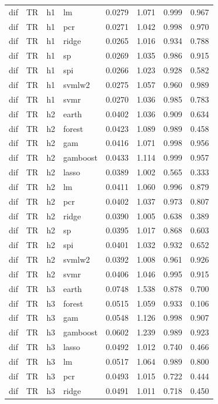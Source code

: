 \begin{ThreePartTable}
\begin{longtable}[t]{llclcccc}
dif & TR & h1 & lm & 0.0279 & 1.071 & 0.999 & 0.967\\
dif & TR & h1 & pcr & 0.0271 & 1.042 & 0.998 & 0.970\\
dif & TR & h1 & ridge & 0.0265 & 1.016 & 0.934 & 0.788\\
dif & TR & h1 & sp & 0.0269 & 1.035 & 0.986 & 0.915\\
dif & TR & h1 & spi & 0.0266 & 1.023 & 0.928 & 0.582\\
dif & TR & h1 & svmlw2 & 0.0275 & 1.057 & 0.960 & 0.989\\
dif & TR & h1 & svmr & 0.0270 & 1.036 & 0.985 & 0.783\\
\addlinespace
dif & TR & h2 & earth & 0.0402 & 1.036 & 0.909 & 0.634\\
dif & TR & h2 & forest & 0.0423 & 1.089 & 0.989 & 0.458\\
dif & TR & h2 & gam & 0.0416 & 1.071 & 0.998 & 0.956\\
dif & TR & h2 & gamboost & 0.0433 & 1.114 & 0.999 & 0.957\\
dif & TR & h2 & lasso & 0.0389 & 1.002 & 0.565 & 0.333\\
dif & TR & h2 & lm & 0.0411 & 1.060 & 0.996 & 0.879\\
dif & TR & h2 & pcr & 0.0402 & 1.037 & 0.973 & 0.807\\
dif & TR & h2 & ridge & 0.0390 & 1.005 & 0.638 & 0.389\\
dif & TR & h2 & sp & 0.0395 & 1.017 & 0.868 & 0.603\\
dif & TR & h2 & spi & 0.0401 & 1.032 & 0.932 & 0.652\\
dif & TR & h2 & svmlw2 & 0.0392 & 1.008 & 0.961 & 0.926\\
dif & TR & h2 & svmr & 0.0406 & 1.046 & 0.995 & 0.915\\
\addlinespace
dif & TR & h3 & earth & 0.0748 & 1.538 & 0.878 & 0.700\\
dif & TR & h3 & forest & 0.0515 & 1.059 & 0.933 & 0.106\\
dif & TR & h3 & gam & 0.0548 & 1.126 & 0.998 & 0.907\\
dif & TR & h3 & gamboost & 0.0602 & 1.239 & 0.989 & 0.923\\
dif & TR & h3 & lasso & 0.0492 & 1.012 & 0.740 & 0.466\\
dif & TR & h3 & lm & 0.0517 & 1.064 & 0.989 & 0.800\\
dif & TR & h3 & pcr & 0.0493 & 1.015 & 0.722 & 0.444\\
dif & TR & h3 & ridge & 0.0491 & 1.011 & 0.718 & 0.450\\

\end{longtable}
\end{ThreePartTable}
